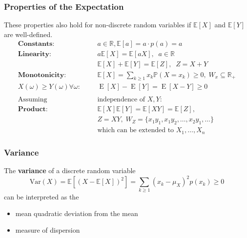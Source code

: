 \subsubsection{Properties of the Expectation}
These properties also hold for non-discrete random variables if $\mathbb{E}[X]$ and $\mathbb{E}[Y]$ are well-defined.
\noindent\begin{align*}
    \textbf{Constants:}                   &  &  & a\in\mathbb{R},\mathbb{E}[a]=a\cdot p(a)=a                                          \\
    \textbf{Linearity:}                   &  &  & a\mathbb{E}[X]=\mathbb{E}[aX],\;\;a\in \mathbb{R}                                   \\
                                          &  &  & \mathbb{E}[X]+\mathbb{E}[Y]=\mathbb{E}[Z],\;\; Z=X+Y                                \\
    \textbf{Monotonicity:}                &  &  & \mathbb{E}[X]=\sum_{k\geq1}x_k\mathbb{P}(X=x_k)\geq0, \; W_x \subseteq \mathbb{R}_+ \\
    X(\omega)\geq Y(\omega)\forall\omega: &  &  & \operatorname{E}[X]-\operatorname{E}[Y]=\operatorname{E}[X-Y]\geq0                  \\\\
    \text{Assuming}                       &  &  & \text{independence of } X,Y:                                                        \\
    \textbf{Product:}                     &  &  & \mathbb{E}[X]\mathbb{E}[Y] = \mathbb{E}[XY] = \mathbb{E}[Z],                        \\
                                          &  &  & Z=XY, \;W_Z =\{x_1y_1,x_1y_2,\ldots,x_2y_1,\ldots\}                                 \\
                                          &  &  & \text{which can be extended to }X_1,\ldots,X_n
\end{align*}

\subsubsection{Variance}
The \textbf{variance} of a discrete random variable
\noindent\begin{equation*}
    \mathrm{Var}(X) = \mathbb{E}[{(X-\mathbb{E}[X])}^2] = \sum_{k\geq1}{(x_k-\mu_X)}^2p(x_k)\geq0
\end{equation*}
can be interpreted as the
\begin{itemize}
    \item mean quadratic deviation from the mean
    \item measure of dispersion
\end{itemize}

